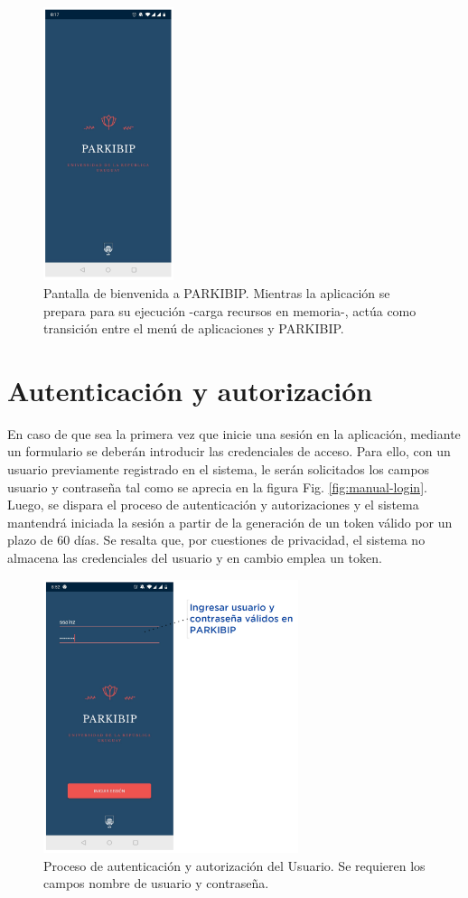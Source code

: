 \begin{figure}[H]
 \centering
 \includegraphics[height=8cm]{TESIS/imagenes/user-manual/manual-splash.PNG}
 \caption{Pantalla de bienvenida a PARKIBIP. Mientras la aplicación se prepara para su ejecución -carga recursos en memoria-, actúa como transición entre el menú de aplicaciones y PARKIBIP.}
 \label{fig:manual-splash}
\end{figure}

\section{Autenticación y autorización}

En caso de que sea la primera vez que inicie una sesión en la aplicación, mediante un formulario se deberán introducir las credenciales de acceso. Para ello, con un usuario previamente registrado en el sistema, le serán solicitados los campos usuario y contraseña tal como se aprecia en la figura Fig. \ref{fig:manual-login}. Luego, se dispara el proceso de autenticación y autorizaciones y el sistema mantendrá iniciada la sesión a partir de la generación de un token válido por un plazo de 60 días. Se resalta que, por cuestiones de privacidad, el sistema no almacena las credenciales del usuario y en cambio emplea un token.

\begin{figure}[H]
 \centering
 \includegraphics[height=8cm]{TESIS/imagenes/user-manual/manual-login.PNG}
 \caption{Proceso de autenticación y autorización del Usuario. Se requieren los campos nombre de usuario y contraseña.}
 \label{fig:}
\end{figure}

